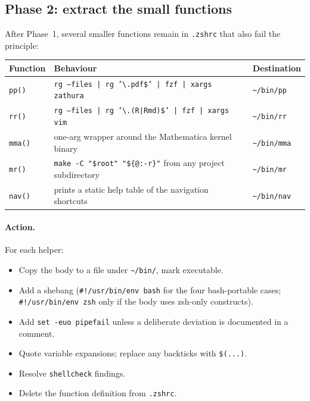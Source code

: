 \documentclass[11pt,letterpaper]{scrartcl}
\begin{document}
\subsection{Phase 2: extract the small functions}

After Phase~1, several smaller functions remain in \texttt{.zshrc}
that also fail the principle:

\begin{longtable}{@{}lp{3.0in}l@{}}
  \toprule
  \textbf{Function} & \textbf{Behaviour} & \textbf{Destination} \\
  \midrule
  \texttt{pp()}   & \texttt{rg --files | rg '\textbackslash.pdf\$' | fzf | xargs zathura}                    & \texttt{\textasciitilde/bin/pp}   \\
  \texttt{rr()}   & \texttt{rg --files | rg '\textbackslash.(R|Rmd)\$' | fzf | xargs vim}                    & \texttt{\textasciitilde/bin/rr}   \\
  \texttt{mma()}  & one-arg wrapper around the Mathematica kernel binary                                     & \texttt{\textasciitilde/bin/mma}  \\
  \texttt{mr()}   & \texttt{make -C "\$root" "\$\{@:-r\}"} from any project subdirectory                     & \texttt{\textasciitilde/bin/mr}   \\
  \texttt{nav()}  & prints a static help table of the navigation shortcuts                                   & \texttt{\textasciitilde/bin/nav}  \\
  \bottomrule
\end{longtable}

\paragraph{Action.} For each helper:

\begin{itemize}
  \item Copy the body to a file under
        \texttt{\textasciitilde/bin/}, mark executable.
  \item Add a shebang (\texttt{\#!/usr/bin/env bash} for the four
        bash-portable cases; \texttt{\#!/usr/bin/env zsh} only if
        the body uses zsh-only constructs).
  \item Add \texttt{set -euo pipefail} unless a deliberate
        deviation is documented in a comment.
  \item Quote variable expansions; replace any backticks with
        \texttt{\$(...)}.
  \item Resolve \texttt{shellcheck} findings.
  \item Delete the function definition from \texttt{.zshrc}.
\end{itemize}
\end{document}
